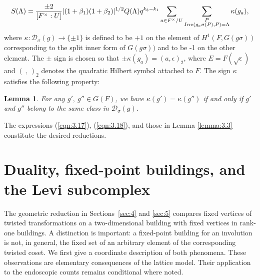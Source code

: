 \documentclass[12pt,letterpaper]{amsart}
\numberwithin{equation}{section}
\newtheorem{lemma}[theorem]{Lemma}
\theoremstyle{definition}
\theoremstyle{plain}
\providecommand{\cal}{\mathcal}
\def\ddd{{\cal D}}
\begin{document}
\begin{equation}
\label{eqn:3.18}
S(\Lambda )={\pm 2\over{[F^{\times}:U]}}|(1+\beta_1)(1+\beta_2)|^{1/2}
Q(\Lambda )q^{k_3-k_1}\sum_{a\in F^{\times}/U}
\sum_{\substack{P\\Inv(g_a\sigma (P),P)=\Lambda}} 
\kappa (g_a),
\end{equation}
where $\kappa :\ddd_{\sigma }(g) \rightarrow \{\pm 1\}$
is defined to be $+1$ on the element of $H^1(F,G(g\sigma ))$
corresponding to the split inner form of $G(g\sigma ))$ and to be
-1 on the other element. The $\pm$ sign is chosen so that 
$\pm\kappa(g_a)=(a,\epsilon)_2$, where $E=F(\sqrt{\epsilon})$
and $(\ ,\ )_2$ denotes the quadratic Hilbert symbol
attached to $F$. The sign $\kappa$ satisfies the following property:

\begin{lemma}
\label{lemma:3.19}
For any $g',\ g'' \in G(F)$, we have
$\kappa (g')=\kappa (g'')$ if and only if $g'$ and $g''$ belong to the
same class in $\ddd_\sigma (g)$.
\end{lemma}
 
The expressions (\ref{eqn:3.17}), (\ref{eqn:3.18}), 
and those in Lemma \ref{lemma:3.3} constitute 
the desired reductions.





\section{Duality, fixed-point buildings, and the Levi subcomplex}
\label{sec:new-geometry}

The geometric reduction in Sections~\ref{sec:4} and \ref{sec:5} compares
fixed vertices of twisted transformations on a two-dimensional building
with fixed vertices in rank-one buildings. A distinction is important:
a fixed-point building for an involution is not, in general, the fixed
set of an arbitrary element of the corresponding twisted coset. We
first give a coordinate description of both phenomena. These
observations are elementary consequences of the lattice model. Their
application to the endoscopic counts remains conditional where noted.
\end{document}
